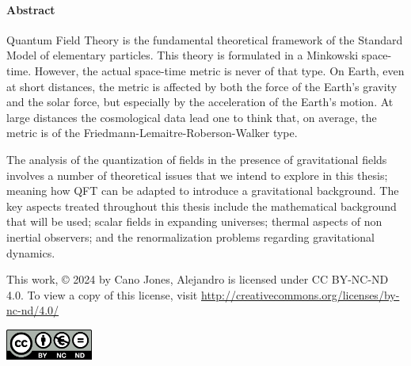 \vspace*{1.0cm}
	\paragraph{Abstract\\}
	\begin{minipage}{13cm}
		
	\vspace*{0.5cm}
	
	Quantum Field Theory is the fundamental theoretical framework of the Standard Model of elementary particles. This theory is formulated in a Minkowski space-time. However, the actual space-time metric is never of that type. On Earth, even at short distances, the metric is affected by both the force of the Earth's gravity and the solar force, but especially by the acceleration of the Earth's motion. At large distances the cosmological data lead one to think that, on average, the metric is of the Friedmann-Lemaitre-Roberson-Walker type.
	
	\vspace*{0.2cm}
	
	The analysis of the quantization of fields in the presence of gravitational fields involves a number of theoretical issues that we intend to explore in this thesis; meaning how QFT can be adapted to introduce a gravitational background. The key aspects treated throughout this thesis include the mathematical background that will be used; scalar fields in expanding universes; thermal aspects of non inertial observers; and the renormalization problems regarding gravitational dynamics.
	
	\end{minipage}
	
	\vspace*{\fill}
	
	
	This work, © 2024 by Cano Jones, Alejandro is licensed under CC BY-NC-ND 4.0. To view a copy of this license, visit \href{http://creativecommons.org/licenses/by-nc-nd/4.0/}{http://creativecommons.org/licenses/by-nc-nd/4.0/}
	
	
	\begin{flushright}
		\includegraphics[height=1cm]{Images/Logos/by-nc-nd.eu}
	\end{flushright}
